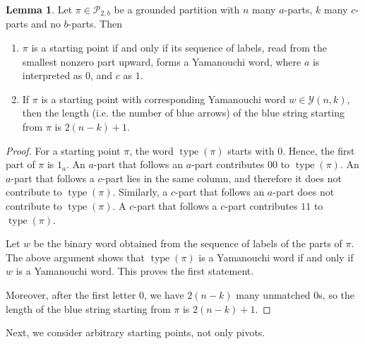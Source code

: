 \documentclass[11pt]{article}
\theoremstyle{definition}
\newtheorem{lemma}[theorem]{Lemma}
\theoremstyle{remark}
\theoremstyle{definition}
\numberwithin{equation}{section}
\newcommand{\type}{\operatorname{type}}
\begin{document}
\begin{lemma}\label{lemma:level2decomp_step1}
  Let \(\pi\in\mathcal{P}_{2,b}\) be a grounded partition with \(n\)
  many \(a\)-parts, \(k\) many \(c\)-parts and no \(b\)-parts. Then
\begin{enumerate}
\item \(\pi\) is a starting point if and only if its sequence of
  labels, read from the smallest nonzero part upward, forms a
  Yamanouchi word, where \( a \) is interpreted as \( 0 \), and
  \( c \) as \( 1 \).
\item If \(\pi\) is a starting point with corresponding Yamanouchi
  word \(w\in\mathcal{Y}(n,k)\), then the length (i.e. the number of
  blue arrows) of the blue string starting from \(\pi\) is
  \(2(n - k) + 1\).
\end{enumerate}
\end{lemma}
\begin{proof}
  For a starting point \(\pi\), the word \(\type(\pi)\) starts with
  \(0\). Hence, the first part of \(\pi\) is \(1_a\). An \(a\)-part
  that follows an \(a\)-part contributes \(00\) to
  \(\type(\pi)\). An \(a\)-part that follows a \(c\)-part lies in the
  same column, and therefore it does not contribute to \(\type(\pi)\).
  Similarly, a \(c\)-part that follows an \(a\)-part does not
  contribute to \(\type(\pi)\). A \(c\)-part that follows a \(c\)-part
  contributes \(11\) to \(\type(\pi)\).

  Let \( w \) be the binary word obtained from the sequence of labels of
  the parts of \( \pi \). The above argument shows that
  \( \type(\pi) \) is a Yamanouchi word if and only if \( w \) is a
  Yamanouchi word. This proves the first statement.

  Moreover, after the first letter \(0\), we have \(2(n - k)\) many
  unmatched \(0\)s, so the length of the blue string starting from
  \(\pi\) is \(2(n - k)+1\).
\end{proof}

Next, we consider arbitrary starting points, not only pivots.
\end{document}
